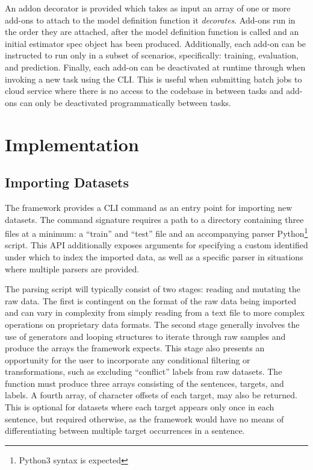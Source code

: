 \documentclass[12pt, a4paper]{report}
\theoremstyle{definition}
\theoremstyle{definition}%
\theoremstyle{definition}%
\theoremstyle{definition}%
\theoremstyle{definition}%
\theoremstyle{definition}%
\begin{document}
An addon decorator is provided which takes as input an array of one or more add-ons to attach to the model definition function it \textit{decorates}. Add-ons run in the order they are attached, after the model definition function is called and an initial estimator spec object has been produced. Additionally, each add-on can be instructed to run only in a subset of scenarios, specifically: training, evaluation, and prediction. Finally, each add-on can be deactivated at runtime through when invoking a new task using the CLI. This is useful when submitting batch jobs to cloud service where there is no access to the codebase in between tasks and add-ons can only be deactivated programmatically between tasks.

\chapter{Implementation}
\section{Importing Datasets} \label{sec:importing_datasets}
The framework provides a CLI command as an entry point for importing new datasets. The command signature requires a path to a directory containing three files at a minimum: a \enquote{train} and \enquote{test} file and an accompanying parser Python\footnote{Python3 syntax is expected} script. This API additionally exposes arguments for specifying a custom identified under which to index the imported data, as well as a specific parser in situations where multiple parsers are provided.

The parsing script will typically consist of two stages: reading and mutating the raw data. The first is contingent on the format of the raw data being imported and can vary in complexity from simply reading from a text file to more complex operations on proprietary data formats. The second stage generally involves the use of generators and looping structures to iterate through raw samples and produce the arrays the framework expects. This stage also presents an opportunity for the user to incorporate any conditional filtering or transformations, such as excluding \enquote{conflict} labels from raw datasets. The function must produce three arrays consisting of the sentences, targets, and labels. A fourth array, of character offsets of each target, may also be returned. This is optional for datasets where each target appears only once in each sentence, but required otherwise, as the framework would have no means of differentiating between multiple target occurrences in a sentence.
\end{document}
